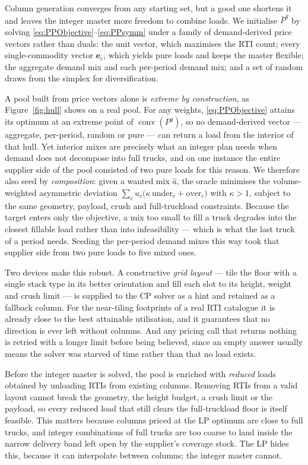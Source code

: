 Column generation converges from any starting set, but a good one
shortens it and leaves the integer master more freedom to combine
loads. We initialise $\bar P^{g}$ by solving
\eqref{eq:PPObjective}--\eqref{eq:PPsymm} under a family of
demand-derived price vectors rather than duals: the unit vector,
which maximises the RTI count; every single-commodity vector
$\mathbf{e}_{c}$, which yields pure loads and keeps the master
flexible; the aggregate demand mix and each per-period demand mix;
and a set of random draws from the simplex for diversification.

A pool built from price vectors alone is \emph{extreme by
construction}, as Figure~\ref{fig:hull} shows on a real pool. For any weights, \eqref{eq:PPObjective} attains its
optimum at an extreme point of $\operatorname{conv}(P^{g})$, so no
demand-derived vector --- aggregate, per-period, random or pure ---
can return a load from the interior of that hull. Yet interior mixes
are precisely what an integer plan needs when demand does not
decompose into full trucks, and on one instance the entire supplier
side of the pool consisted of two pure loads for this reason. We
therefore also seed by \emph{composition}: given a wanted mix
$\hat{a}$, the oracle minimises the volume-weighted asymmetric
deviation
$\sum_{c}u_{c}\bigl(\kappa\,\mathrm{under}_{c}+\mathrm{over}_{c}\bigr)$
with $\kappa>1$, subject to the same geometry, payload, crush and
full-truckload constraints. Because the target enters only the
objective, a mix too small to fill a truck degrades into the closest
fillable load rather than into infeasibility --- which is what the
last truck of a period needs. Seeding the per-period demand mixes this
way took that supplier side from two pure loads to five mixed ones.



Two devices make this robust. A constructive \emph{grid layout} ---
tile the floor with a single stack type in its better orientation and
fill each slot to its height, weight and crush limit --- is supplied
to the CP solver as a hint and retained as a fallback column. For the
near-tiling footprints of a real RTI catalogue it is already close to
the best attainable utilisation, and it guarantees that no direction
is ever left without columns. And any pricing call that returns
nothing is retried with a longer limit before being believed, since
an empty answer usually means the solver was starved of time rather
than that no load exists.

Before the integer master is solved, the pool is enriched with
\emph{reduced} loads obtained by unloading RTIs from existing
columns. Removing RTIs from a valid layout cannot break the geometry,
the height budget, a crush limit or the payload, so every reduced
load that still clears the full-truckload floor is itself feasible.
This matters because columns priced at the LP optimum are close to
full trucks, and integer combinations of full trucks are too coarse
to land inside the narrow delivery band left open by the supplier's
coverage stock. The LP hides this, because it can interpolate between
columns; the integer master cannot.

